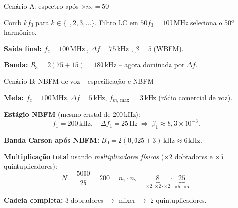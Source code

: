 \begin{frame}{Cenário A: espectro após $\times n_2 = 50$}

Comb $k f_3$ para $k \in \{1, 2, 3, \ldots\}$. Filtro LC em $50 f_3 = 100$\,MHz seleciona o 50º harmônico.

\begin{center}
\end{center}

\textbf{Saída final:} $f_c = 100$\,MHz \checkmark,\;\; $\Delta f = 75$\,kHz \checkmark,\;\; $\beta = 5$ (WBFM).

\textbf{Banda:} $B_3 = 2(75 + 15) = 180$\,kHz -- agora dominada por $\Delta f$.

\end{frame}


\begin{frame}{Cenário B: NBFM de voz -- especificação e NBFM}

\textbf{Meta:} $f_c = 100$\,MHz, $\Delta f = 5$\,kHz, $f_{m,\max} = 3$\,kHz (rádio comercial de voz).

\pause
\textbf{Estágio NBFM} (mesmo cristal de 200\,kHz):
\[
f_1 = 200\,\text{kHz}, \quad \Delta f_1 = 25\,\text{Hz} \;\Rightarrow\; \beta_1 \approx 8{,}3\!\times\!10^{-3}.
\]

\pause
\textbf{Banda Carson após NBFM:} $B_0 = 2(0{,}025 + 3)\,\text{kHz} \approx 6\,\text{kHz}$.

\pause
\textbf{Multiplicação total} usando \emph{multiplicadores físicos} ($\times 2$ dobradores e $\times 5$ quintuplicadores):
\[
N = \frac{5000}{25} = 200 = n_1\cdot n_2 = \underbrace{8}_{\times 2\cdot\times 2\cdot\times 2}\cdot\underbrace{25}_{\times 5\cdot\times 5}.
\]

\textbf{Cadeia completa:} 3 dobradores $\to$ mixer $\to$ 2 quintuplicadores.

\end{frame}

